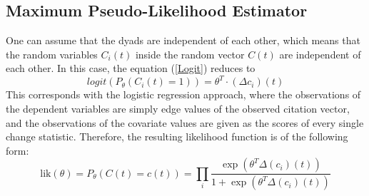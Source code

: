\documentclass[headsepline=true, abstracton]{scrartcl}
\begin{document}
\subsection*{Maximum Pseudo-Likelihood Estimator}
One can assume that the dyads are independent of each other, which means that
the random variables $C_i(t)$ inside the random vector $C(t)$ are independent of each other.
In this case, the equation (\ref{Logit}) reduces to
$$logit(P_{\theta}(C_i(t) = 1)) = \theta^T \cdot (\Delta c_i)(t)$$
This corresponds with the logistic regression approach, where the observations of
the dependent variables are simply edge values of the observed citation vector,
and the observations of the covariate values are given as the scores of every single
change statistic. Therefore, the resulting likelihood function is of the following form:
\begin{equation}
\text{lik}(\theta)= P_{\theta}(C(t)=c(t))= \prod_{i} \dfrac{ \exp \left(\theta^T \Delta(c_i)(t) \right)}{1+\exp \left(\theta^T \Delta(c_i)(t) \right)}
\label{PseudoLik}
\end{equation}
\end{document}
